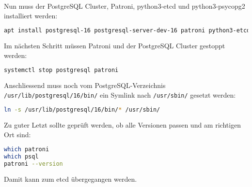 \begin{flushleft}
    Nun muss der \Gls{PostgreSQL Cluster}, Patroni, python3-etcd und python3-psycopg2 installiert werden:
\lstset{style=gra_codestyle}
\begin{lstlisting}[language=bash, caption=Patroni - Prerequisites installieren,captionpos=b,label={lst:patroni-prerequisites-install},breaklines=true]
apt install postgresql-16 postgresql-server-dev-16 patroni python3-etcd python3-psycopg2
\end{lstlisting}
    Im nächsten Schritt müssen Patroni und der \Gls{PostgreSQL Cluster} gestoppt werden:
\lstset{style=gra_codestyle}
\begin{lstlisting}[language=bash, caption=Patroni - Stop Patroni und PostgreSQL,captionpos=b,label={lst:patroni-stop-postgresql-patroni},breaklines=true]
systemctl stop postgresql patroni
\end{lstlisting}
    Anschliessend muss noch vom PostgreSQL-Verzeichnis \texttt{/usr/lib/postgresql/16/bin/} ein Symlink nach \texttt{/usr/sbin/} gesetzt werden:
\lstset{style=gra_codestyle}
\begin{lstlisting}[language=bash, caption=Patroni - Symlink bin,captionpos=b,label={lst:patroni-symlink-bin},breaklines=true]
ln -s /usr/lib/postgresql/16/bin/* /usr/sbin/
\end{lstlisting}

\end{flushleft}
\begin{flushleft}
    Zu guter Letzt sollte geprüft werden, ob alle Versionen passen und am richtigen Ort sind:
\lstset{style=gra_codestyle}
\begin{lstlisting}[language=bash, caption=Patroni - Checks,captionpos=b,label={lst:patroni-checks},breaklines=true]
which patroni
which psql
patroni --version
\end{lstlisting}
    Damit kann zum \gls{etcd} übergegangen werden.
\end{flushleft}

